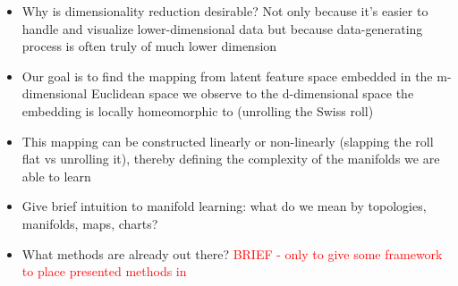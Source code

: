\begin{itemize}
  \item Why is dimensionality reduction desirable? Not only because it's easier 
  to handle and visualize lower-dimensional data but because data-generating 
  process is often truly of much lower dimension
  \item Our goal is to find the mapping from latent feature space embedded in 
  the m-dimensional Euclidean space we observe to the d-dimensional space the
  embedding is locally homeomorphic to (unrolling the Swiss roll)
  \item This mapping can be constructed linearly or non-linearly (slapping the 
  roll flat vs unrolling it), thereby defining the complexity of the manifolds 
  we are able to learn
  \item Give brief intuition to manifold learning: what do we mean by 
  topologies, manifolds, maps, charts?
  \item What methods are already out there? \textcolor{red}{BRIEF - only to
  give some framework to place presented methods in}
\end{itemize}





